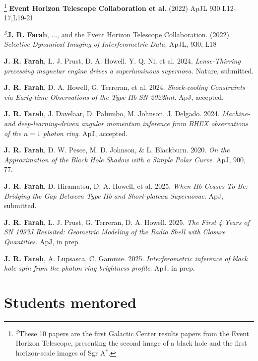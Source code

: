 \documentclass[margin,line]{res}
\begin{document}
\begin{resume}
\footnote[$^S$]{\noindent $^S$These 10  papers are the first Galactic Center results papers from the Event Horizon Telescope, presenting the second image of a black hole and the first horizon-scale images of Sgr A$^\ast$.}
\textbf{Event Horizon Telescope Collaboration et al}. (2022) ApJL 930 L12-17,L19-21

\textbf{$^S$J. R. Farah}, ..., and the Event Horizon Telescope Collaboration. (2022) \textit{Selective Dynamical Imaging of Interferometric Data.} ApJL, 930, L18

\textbf{J. R. Farah}, L. J. Prust, D. A. Howell. Y. Q. Ni, et al. 2024. \textit{Lense-Thirring precessing magnetar engine drives a superluminous supernova.} Nature, submitted.


\textbf{J. R. Farah}, D. A. Howell, G. Terreran, et al. 2024. \textit{Shock-cooling Constraints via Early-time Observations of the Type IIb SN 2022hnt}. ApJ, accepted.


\textbf{J. R. Farah}, J. Davelaar, D. Palumbo, M. Johnson, J. Delgado. 2024. \textit{Machine- and deep-learning-driven angular momentum inference from BHEX observations of the $n = 1$ photon ring}. ApJ, accepted.

\textbf{J. R. Farah}, D. W. Pesce, M. D. Johnson, \& L. Blackburn. 2020. \textit{On the Approximation of the Black Hole Shadow with a Simple Polar Curve}. ApJ, 900, 77.


\textbf{J. R. Farah}, D. Hiramatsu, D. A. Howell, et al. 2025. \textit{When IIb Ceases To Be: Bridging the Gap Between Type IIb and Short-plateau Supernovae}. ApJ, submitted.

\textbf{J. R. Farah}, L. J. Prust, G. Terreran, D. A. Howell. 2025. \textit{The First 4 Years of SN 1993J Revisited: Geometric Modeling of the Radio Shell with Closure Quantities}. ApJ, in prep.

\textbf{J. R. Farah}, A. Lupsasca, C. Gammie. 2025. \textit{Interferometric inference of black hole spin from the photon ring brightness profile}. ApJ, in prep.






\vspace{+.4cm}
\section{\sc Students mentored}


\end{resume}
\end{document}
